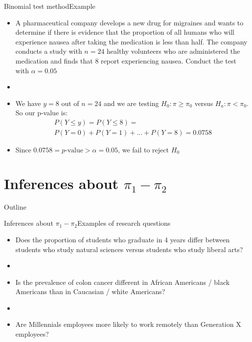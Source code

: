 \documentclass[xcolor=dvipsnames]{beamer}
\begin{document}
\begin{frame}{Binomial test method}{Example}
	\begin{itemize}
		\item A pharmaceutical company develops a new drug for migraines and wants to determine if there is evidence that the proportion of all humans who will experience nausea after taking the medication is less than half. The company conducts a study with $n = 24$ healthy volunteers who are administered the medication and finds that 8 report experiencing nausea. Conduct the test with $\alpha = 0.05$  \pause
		\item[]
		\item We have $y = 8$ out of $n = 24$ and we are testing $H_0: \pi \geq \pi_0$ versus $H_a: \pi < \pi_0$.  \pause So our p-value is:  \pause
		\begin{gather*}
			P(Y \leq y) = P(Y \leq 8) = \\
			 P(Y = 0) + P(Y = 1) + \hdots + P(Y = 8) =0.0758
		\end{gather*}  \pause
		\item Since $0.0758 = p\text{-value} > \alpha = 0.05$, we fail to reject $H_0$
	\end{itemize}
\end{frame}

\section{Inferences about $\pi_1 - \pi_2$}

\begin{frame}{Outline}
	\tableofcontents[currentsection,subsectionstyle=show/shaded/hide]
\end{frame}

\begin{frame}{Inferences about $\pi_1 - \pi_2$}{Examples of research questions}
	\begin{itemize}
		\item Does the proportion of students who graduate in 4 years differ between students who study natural sciences versus students who study liberal arts?  \pause
		\item[]
		\item Is the prevalence of colon cancer different in African Americans / black Americans than in Caucasian / white Americans?  \pause
		\item[]
		\item Are Millennials employees more likely to work remotely than Generation X employees?
	\end{itemize}
\end{frame}
\end{document}
